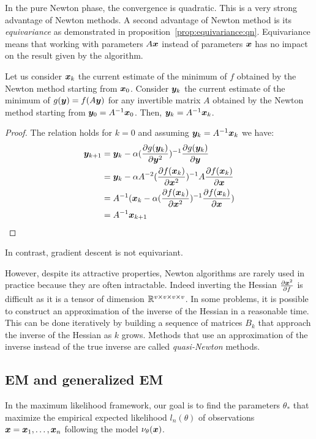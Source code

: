 In the pure Newton phase, the convergence is quadratic. This is a very strong
advantage of Newton methods.
A second advantage of Newton method is its \emph{equivariance} as demonstrated
in proposition~\ref{prop:equivariance:qn}. Equivariance means that working with
parameters $A \xb$ instead of parameters $\xb$ has no impact on the result given
by the algorithm.
\begin{prop}
  \label{prop:equivariance:qn}
  Let us consider $\xb_k$ the current estimate of the minimum of $f$ obtained by
  the Newton method starting from $\xb_0$.
  Consider $\yb_k$ the current estimate of the minimum of $g(\yb) = f(A\yb)$ for any
  invertible matrix $A$ obtained by the Newton method starting from $\yb_0 = A^{-1}\xb_0$.
  Then, $\yb_k = A^{-1} \xb_k$.
\end{prop}
\begin{proof}
  The relation holds for $k=0$ and assuming $\yb_k = A^{-1} \xb_k$ we have:
\begin{align}
  \yb_{k+1} &= \yb_k -\alpha (\partialfrac{\yb^2}{g(\yb_k)})^{-1} \partialfrac{\yb}{g(\yb_k)} \\
  &= \yb_k -\alpha A^{-2}(\partialfrac{\xb^2}{f(\xb_k)})^{-1} A \partialfrac{\xb}{f(\xb_k)} \\
  &= A^{-1} (\xb_k -\alpha (\partialfrac{\xb^2}{f(\xb_k)})^{-1} \partialfrac{\xb}{f( \xb_k)}) \\
            &= A^{-1} \xb_{k+1} \\
\end{align}
\end{proof}
In contrast, gradient descent is not equivariant.

However, despite its attractive properties, Newton algorithms are rarely used in
practice because they are often intractable. Indeed inverting
the Hessian $\partialfrac{f}{\xb^2}$ is difficult as it is a tensor of dimension $\RR^{v \times v \times v \times
  v}$.
In some problems, it is possible to construct an approximation of the inverse of
the Hessian in a reasonable time. This can be done iteratively by building a
sequence of matrices $B_k$ that approach the inverse of the Hessian as $k$ grows.
Methods that use an approximation of the inverse instead of the true inverse are
called \emph{quasi-Newton} methods. 

\subsection{EM and generalized EM}
In the maximum likelihood framework, our goal is to find the parameters
$\theta_*$ that maximize the empirical expected likelihood $l_n(\theta)$ of
observations $\xb = \xb_1, \dots, \xb_n$ following the model
$\nu_{\theta}(\xb)$.

